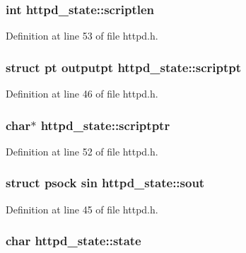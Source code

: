 \hypertarget{structhttpd__state_a16a3a3056f44b7245ce085b937a269dd}{
\subsubsection[{scriptlen}]{\setlength{\rightskip}{0pt plus 5cm}int {\bf httpd\_\-state::scriptlen}}}
\label{structhttpd__state_a16a3a3056f44b7245ce085b937a269dd}


Definition at line 53 of file httpd.h.

\hypertarget{structhttpd__state_ae261f08e1556287d241764fb2e99fc26}{
\subsubsection[{scriptpt}]{\setlength{\rightskip}{0pt plus 5cm}struct {\bf pt} outputpt {\bf httpd\_\-state::scriptpt}}}
\label{structhttpd__state_ae261f08e1556287d241764fb2e99fc26}


Definition at line 46 of file httpd.h.

\hypertarget{structhttpd__state_a78f82878f3fd0e7401c7d7d3b3fefbef}{
\subsubsection[{scriptptr}]{\setlength{\rightskip}{0pt plus 5cm}char$\ast$ {\bf httpd\_\-state::scriptptr}}}
\label{structhttpd__state_a78f82878f3fd0e7401c7d7d3b3fefbef}


Definition at line 52 of file httpd.h.

\hypertarget{structhttpd__state_a9dd8edeece221c853a4c4516bf1b01c2}{
\subsubsection[{sout}]{\setlength{\rightskip}{0pt plus 5cm}struct {\bf psock} sin {\bf httpd\_\-state::sout}}}
\label{structhttpd__state_a9dd8edeece221c853a4c4516bf1b01c2}


Definition at line 45 of file httpd.h.

\hypertarget{structhttpd__state_a94fcc9f5c47f419040d849ce58beae35}{
\subsubsection[{state}]{\setlength{\rightskip}{0pt plus 5cm}char {\bf httpd\_\-state::state}}}
\label{structhttpd__state_a94fcc9f5c47f419040d849ce58beae35}


